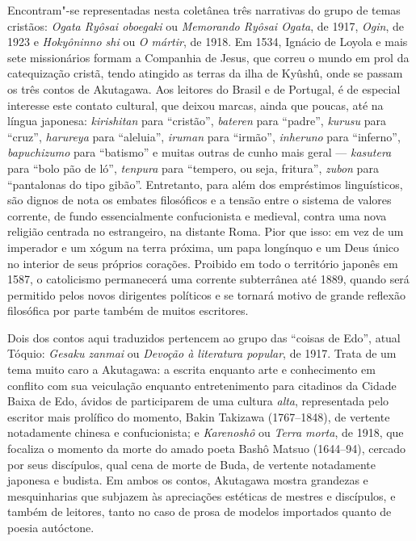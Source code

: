 Encontram"-se representadas nesta coletânea três narrativas do grupo de
temas cristãos: \textit{Ogata Ryôsai oboegaki} ou \textit{Memorando Ryôsai Ogata}, 
de 1917, \textit{Ogin}, de 1923 e
\textit{Hokyôninno shi} ou \textit{O mártir}, de 1918.  Em
1534, Ignácio de Loyola e mais sete missionários formam a Companhia de
Jesus, que correu o mundo em prol da catequização cristã, tendo
atingido as terras da ilha de Kyûshû, onde se passam os três contos de
Akutagawa. Aos leitores do Brasil e de Portugal, é de especial
interesse este contato cultural, que deixou marcas, ainda que poucas,
até na língua japonesa: \textit{kirishitan} para ``cristão'',
\textit{bateren} para ``padre'', \textit{kurusu} para ``cruz'',
\textit{harureya} para ``aleluia'', \textit{iruman} para ``irmão'',
\textit{inheruno} para ``inferno'', \textit{bapuchizumo} para ``batismo''
e muitas outras de cunho mais geral --- \textit{kasutera} para ``bolo pão
de ló'', \textit{tenpura} para ``tempero, ou seja, fritura'',
\textit{zubon} para ``pantalonas do tipo gibão''. Entretanto, para além
dos empréstimos linguísticos, são dignos de nota os embates filosóficos 
e a tensão entre o sistema de valores corrente, de fundo essencialmente
confucionista e medieval, contra uma nova religião centrada no
estrangeiro, na distante Roma. Pior que isso: em vez de um imperador e um
xógum na terra próxima, um papa longínquo e um Deus único no interior
de seus próprios corações. Proibido em todo o território japonês em
1587, o catolicismo permanecerá uma corrente subterrânea até 1889, 
quando será permitido pelos novos dirigentes políticos e se tornará
motivo de grande reflexão filosófica por parte também de muitos escritores.

Dois dos contos aqui traduzidos pertencem ao grupo das ``coisas de Edo'', atual Tóquio: \textit{Gesaku zanmai} ou \textit{Devoção à literatura popular}, de 1917. 
Trata de um tema muito caro a Akutagawa: a escrita
enquanto arte e conhecimento em conflito com sua veiculação enquanto
entretenimento para citadinos da Cidade Baixa de Edo, ávidos de
participarem de uma cultura \textit{alta}, representada pelo escritor mais
prolífico do momento, Bakin Takizawa  (1767--1848), de vertente
notadamente chinesa e confucionista; e \textit{Karenoshô} ou \textit{Terra morta}, de 1918, 
que focaliza o momento da morte do amado poeta Bashô Matsuo (1644--94), 
cercado por seus discípulos, qual cena de morte de
Buda, de vertente notadamente japonesa e budista. Em ambos os contos, 
Akutagawa mostra grandezas e mesquinharias que subjazem às apreciações
estéticas de mestres e discípulos, e também de leitores, tanto no caso
de prosa de modelos importados quanto de poesia autóctone.

